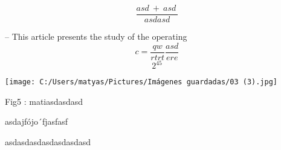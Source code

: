 \documentclass[10pt,a4paper]{article}
\begin{document}
\begin{multicols}{2}
\begin{equation}
\frac{asd\ +\ asd\ }{asdasd}   
\end{equation}


– This article presents the study of the operating 
	\[c=\frac{qw}{rtrt} \dfrac{asd }{ere} \]  %
	\begin{equation}   %
	2^{45} 
	\end{equation}
	
	
\begin{center}
 \texttt{[image: C:/Users/matyas/Pictures/Imágenes guardadas/03 (3).jpg]}
 \end{center} 



\begin{center}
Fig5 : matiasdasdasd
\end{center}
asdajfójo´fjasfasf


 
\begin{thebibliography}{99} %

\bibitem{} {asdasdasdasdasdasdasd}

\end{thebibliography}


\end{multicols}
\end{document}
